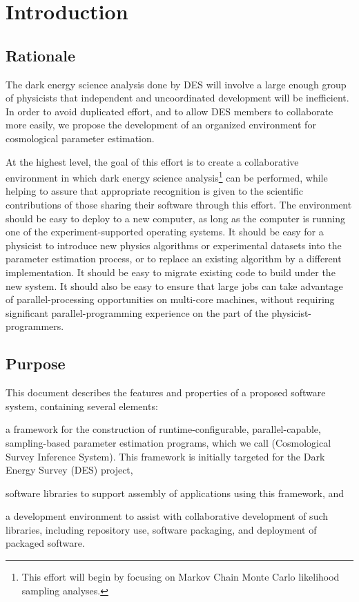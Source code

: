 \documentclass[draftmode,draftwater]{memarticle}
\newcommand{\cosmosis}{\name{CosmoSIS}\xspace}
\begin{document}
	
\topmatter %

\chapter{Introduction\label{ch:introduction}}

\section{Rationale\label{sec:rationale}}

The dark energy science analysis done by DES will involve a large enough
group of physicists that independent and uncoordinated development will
be inefficient. In order to avoid duplicated effort, and to allow DES
members to collaborate more easily, we propose the development of an
organized environment for cosmological parameter estimation.

At the highest level, the goal of this effort is to create a
collaborative environment in which dark energy science
analysis\footnote{This effort will begin by focusing on Markov Chain
  Monte Carlo likelihood sampling analyses.} can be performed, while
helping to assure that appropriate recognition is given to the
scientific contributions of those sharing their software through this effort.
The
environment should be easy to deploy to a new computer, as long as the
computer is running one of the experiment-supported operating systems.
It should be easy for a physicist to introduce new physics algorithms or experimental datasets
into the parameter estimation process, or to replace an existing
algorithm by a different implementation. It should be easy to migrate
existing code to build under the new system. It should also be easy to
ensure that large jobs can take advantage of parallel-processing
opportunities on multi-core machines, without requiring significant
parallel-programming experience on the part of the
physicist-programmers.

\section{Purpose\label{sec:purpose}}

This document describes the features and properties of a proposed
software system, containing several elements:
\begin{inparaenum}[(a)]
\item a framework for the construction of runtime-configurable,
  parallel-capable, sampling-based parameter estimation programs, which
  we call \cosmosis (Cosmological Survey Inference System). This
  framework is initially targeted for the Dark Energy Survey
  (DES)\cite{des} project,
\item software libraries to support assembly of applications using this
  framework, and
\item a development environment to assist with collaborative development
  of such libraries, including repository use, software packaging, and
  deployment of packaged software.
\end{inparaenum}
\end{document}
